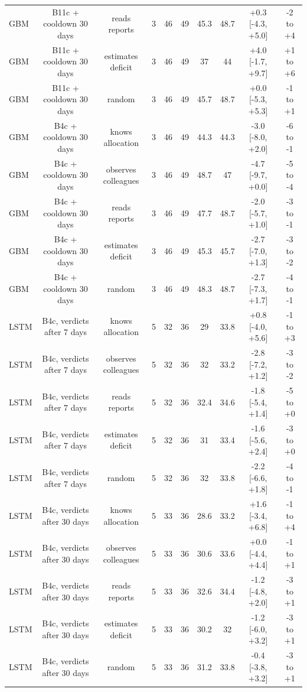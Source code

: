 \documentclass[10pt,onecolumn,letterpaper]{article}
\begin{document}
\begin{table}[!t]
{\begin{tabular}{lccccccccc}
GBM & B11c + cooldown 30 days & reads reports & 3 & 46 & 49 & 45.3 & 48.7 & +0.3 [-4.3, +5.0] & -2 to +4 \\
GBM & B11c + cooldown 30 days & estimates deficit & 3 & 46 & 49 & 37 & 44 & +4.0 [-1.7, +9.7] & +1 to +6 \\
GBM & B11c + cooldown 30 days & random & 3 & 46 & 49 & 45.7 & 48.7 & +0.0 [-5.3, +5.3] & -1 to +1 \\
GBM & B4c + cooldown 30 days & knows allocation & 3 & 46 & 49 & 44.3 & 44.3 & -3.0 [-8.0, +2.0] & -6 to -1 \\
GBM & B4c + cooldown 30 days & observes colleagues & 3 & 46 & 49 & 48.7 & 47 & -4.7 [-9.7, +0.0] & -5 to -4 \\
GBM & B4c + cooldown 30 days & reads reports & 3 & 46 & 49 & 47.7 & 48.7 & -2.0 [-5.7, +1.0] & -3 to -1 \\
GBM & B4c + cooldown 30 days & estimates deficit & 3 & 46 & 49 & 45.3 & 45.7 & -2.7 [-7.0, +1.3] & -3 to -2 \\
GBM & B4c + cooldown 30 days & random & 3 & 46 & 49 & 48.3 & 48.7 & -2.7 [-7.3, +1.7] & -4 to -1 \\
LSTM & B4c, verdicts after 7 days & knows allocation & 5 & 32 & 36 & 29 & 33.8 & +0.8 [-4.0, +5.6] & -1 to +3 \\
LSTM & B4c, verdicts after 7 days & observes colleagues & 5 & 32 & 36 & 32 & 33.2 & -2.8 [-7.2, +1.2] & -3 to -2 \\
LSTM & B4c, verdicts after 7 days & reads reports & 5 & 32 & 36 & 32.4 & 34.6 & -1.8 [-5.4, +1.4] & -5 to +0 \\
LSTM & B4c, verdicts after 7 days & estimates deficit & 5 & 32 & 36 & 31 & 33.4 & -1.6 [-5.6, +2.4] & -3 to +0 \\
LSTM & B4c, verdicts after 7 days & random & 5 & 32 & 36 & 32 & 33.8 & -2.2 [-6.6, +1.8] & -4 to -1 \\
LSTM & B4c, verdicts after 30 days & knows allocation & 5 & 33 & 36 & 28.6 & 33.2 & +1.6 [-3.4, +6.8] & -1 to +4 \\
LSTM & B4c, verdicts after 30 days & observes colleagues & 5 & 33 & 36 & 30.6 & 33.6 & +0.0 [-4.4, +4.4] & -1 to +1 \\
LSTM & B4c, verdicts after 30 days & reads reports & 5 & 33 & 36 & 32.6 & 34.4 & -1.2 [-4.8, +2.0] & -3 to +1 \\
LSTM & B4c, verdicts after 30 days & estimates deficit & 5 & 33 & 36 & 30.2 & 32 & -1.2 [-6.0, +3.2] & -3 to +1 \\
LSTM & B4c, verdicts after 30 days & random & 5 & 33 & 36 & 31.2 & 33.8 & -0.4 [-3.8, +3.2] & -3 to +1 \\

\end{tabular}}
\end{table}
\end{document}
